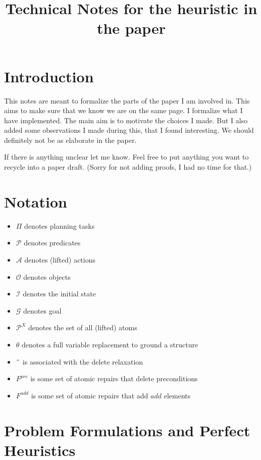 \documentclass[twocolumn]{article}
\title{Technical Notes for the heuristic in the paper}
\newcommand{\task}{\ensuremath{\Pi}\xspace}
\newcommand{\preds}{\ensuremath{\mathcal{P}}\xspace}
\newcommand{\acts}{\ensuremath{\mathcal{A}}\xspace}
\newcommand{\objects}{\ensuremath{\mathcal{O}}\xspace}
\newcommand{\init}{\ensuremath{\mathcal{I}}\xspace}
\newcommand{\goal}{\ensuremath{\mathcal{G}}\xspace}
\newcommand{\vars}{\ensuremath{X}\xspace}
\newcommand{\varRepl}{\ensuremath{\theta}\xspace}
\newcommand{\atoms}{\ensuremath{\preds^{\vars}}\xspace}
\newcommand{\prename}{\ensuremath{pre}\xspace}
\newcommand{\addname}{\ensuremath{add}\xspace}
\newcommand{\fixPre}{\ensuremath{F^{\prename}}\xspace}
\newcommand{\fixAdd}{\ensuremath{F^{\addname}}\xspace}
\begin{document}
	
	\maketitle
	
	\section{Introduction}
	
	This notes are meant to formalize the parts of the paper I am involved in.
	This aims to make sure that we know we are on the same page.
	I formalize what I have implemented.
	The main aim is to motivate the choices I made.
	But I also added  some observations I made during this, that I found interesting. 
	We should definitely not be as elaborate in the paper.
	
	
	If there is anything unclear let me know. 
	Feel free to put anything you want to recycle into a paper draft.
	(Sorry for not adding proofs, I had no time for that.)
	
	\section{Notation}
	
	\begin{itemize}[noitemsep]
		\item \task denotes planning tasks
		\item \preds denotes predicates
		\item \acts denotes (lifted) actions
		\item \objects denotes objects
		\item \init denotes the initial state
		\item \goal denotes goal
		\item \atoms denotes the set of all (lifted) atoms
		\item \varRepl denotes a full variable replacement to ground a structure
		\item $^+$ is associated with the delete relaxation
		\item \fixPre is some set of atomic repairs that delete preconditions
		\item \fixAdd is some set of atomic repairs that add \addname elements
	\end{itemize}
	
	
	\section{Problem Formulations and Perfect Heuristics}
	
\end{document}
